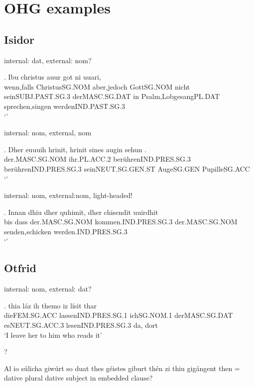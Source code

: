 \chapter{OHG examples}

\section{Isidor}

internal: dat, external: nom?

\exg. Ibu christus auur got ni uuari,     \\
wenn,falls ChristusSG.NOM aber,jedoch GottSG.NOM nicht seinSUBJ.PAST.SG.3 derMASC.SG.DAT in Psalm,LobgesangPL.DAT sprechen,singen werdenIND.PAST.SG.3\\
`' 


internal: nom, external, nom

\exg. Dher euuuih hrinit, hrinit sines augin sehun .\\
 der.MASC.SG.NOM ihr.PL.ACC.2 berührenIND.PRES.SG.3 berührenIND.PRES.SG.3 seinNEUT.SG.GEN.ST AugeSG.GEN PupilleSG.ACC\\
`' 


internal: nom, external:nom, light-headed!

\exg. Innan dhiu dher quhimit, dher chisendit uuirdhit\\
bis dass der.MASC.SG.NOM kommen.IND.PRES.SG.3  der.MASC.SG.NOM senden,schicken werden.IND.PRES.SG.3\\
`' 


\phantom{x}

\section{Otfrid}

internal: nom, external: dat?

\exg. thia	láz	ih	themo	iz	lísit	thar\\
dieFEM.SG.ACC	lassenIND.PRES.SG.1	ichSG.NOM.1	derMASC.SG.DAT	esNEUT.SG.ACC.3	lesenIND.PRES.SG.3	da, dort\\
`I leave her to him who reads it' 


?

Al	io	súlicha	giwúrt	so	duat	thes	géistes	giburt	thén	zi	thiu	gigángent
then = dative plural
dative subject in embedded clause?


